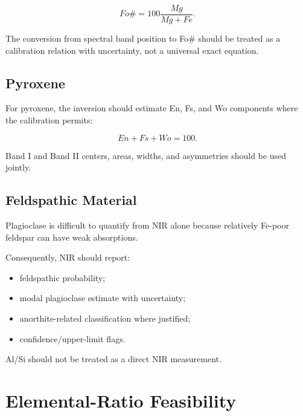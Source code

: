 \documentclass[11pt,a4paper]{article}
\begin{document}
\begin{equation}
Fo\#
=
100
\frac{Mg}{Mg+Fe}.
\end{equation}

The conversion from spectral band position to Fo\# should be treated as a calibration relation with uncertainty, not a universal exact equation.

\subsection{Pyroxene}

For pyroxene, the inversion should estimate En, Fs, and Wo components where the calibration permits:

\begin{equation}
En+Fs+Wo=100.
\end{equation}

Band I and Band II centers, areas, widths, and asymmetries should be used jointly.

\subsection{Feldspathic Material}

Plagioclase is difficult to quantify from NIR alone because relatively Fe-poor feldspar can have weak absorptions.

Consequently, NIR should report:

\begin{itemize}
    \item feldspathic probability;
    \item modal plagioclase estimate with uncertainty;
    \item anorthite-related classification where justified;
    \item confidence/upper-limit flags.
\end{itemize}

Al/Si should not be treated as a direct NIR measurement.

\section{Elemental-Ratio Feasibility}
\end{document}

